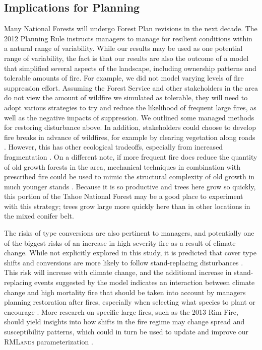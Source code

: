 \subsection{Implications for Planning}
Many National Forests will undergo Forest Plan revisions in the next decade. The 2012 Planning Rule instructs managers to manage for resilient conditions within a natural range of variability. While our results may be used as one potential range of variability, the fact is that our results are also the outcome of a model that simplified several aspects of the landscape, including ownership patterns and tolerable amounts of fire. For example, we did not model varying levels of fire suppression effort. Assuming the Forest Service and other stakeholders in the area do not view the amount of wildfire we simulated as tolerable, they will need to adopt various strategies to try and reduce the likelihood of frequent large fires, as well as the negative impacts of suppression. We outlined some managed methods for restoring disturbance above. In addition, stakeholders could choose to develop fire breaks in advance of wildfires, for example by clearing vegetation along roads \citep{Conard2003}. However, this has other ecological tradeoffs, especially from increased fragmentation \citep{Trombulak2000}. On a different note, if more frequent fire does reduce the quantity of old growth forests in the area, mechanical techniques in combination with prescribed fire could be used to mimic the structural complexity of old growth in much younger stands \citep{Franklin2002}. Because it is so productive and trees here grow so quickly, this portion of the Tahoe National Forest may be a good place to experiment with this strategy; trees grow large more quickly here than in other locations in the mixed conifer belt. 

The risks of type conversions are also pertinent to managers, and potentially one of the biggest risks of an increase in high severity fire as a result of climate change. While not explicitly explored in this study, it is predicted that cover type shifts and conversions are more likely to follow stand-replacing disturbances \citep{Stephens2013}. This risk will increase with climate change, and the additional increase in stand-replacing events suggested by the model indicates an interaction between climate change and high mortality fire that should be taken into account by managers planning restoration after fires, especially when selecting what species to plant or encourage \citep{Fule2008,Schwartz2015}. More research on specific large fires, such as the 2013 Rim Fire, should yield insights into how shifts in the fire regime may change spread and susceptibility patterns, which could in turn be used to update and improve our \textsc{RMLands} parameterization \citep{Lydersen2014}.

